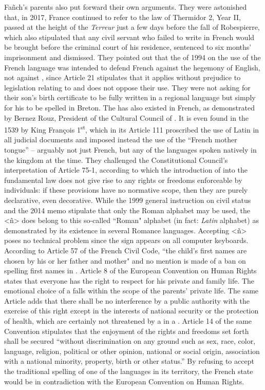 \documentclass[output=paper,colorlinks,citecolor=brown]{langscibook}
\begin{document}
Fañch's parents also put forward their own arguments. They were astonished that, in 2017, France continued to refer to the law of Thermidor 2, Year II, passed at the height of the \textit{Terreur} just a few days before the fall of Robespierre, which also stipulated that any civil servant who failed to write in French would be brought before the criminal court of his residence, sentenced to six months' imprisonment and dismissed. They pointed out that the  of 1994 on the use of the French language was intended to defend French against the hegemony of English, not against , since Article 21 stipulates that it applies without prejudice to legislation relating to  and does not oppose their use. They were not asking for their son's birth certificate to be fully written in a regional language but simply for his  to be spelled in Breton. The  has also existed in French, as demonstrated by Bernez Rouz, President of the Cultural Council of . It is even found in the 1539  by King François 1\textsuperscript{st}, which in its Article 111 proscribed the use of Latin in all judicial documents and imposed instead the use of the ``French mother tongue” – arguably not just French, but any of the languages spoken natively in the kingdom at the time. They challenged the Constitutional Council's interpretation of Article 75-1, according to which the introduction of  into the fundamental law does not give rise to any rights or freedoms enforceable by individuals: if these provisions have no normative scope, then they are purely declarative, even decorative. While the 1999 general instruction on civil status and the 2014 memo stipulate that only the Roman alphabet may be used, the <ñ> does belong to this so-called ``Roman" alphabet (in fact: \textit{Latin} alphabet) as demonstrated by its existence in several Romance languages. Accepting <ñ> poses no technical problem since the sign appears on all computer keyboards. According to Article 57 of the French Civil Code, ``the child's first names are chosen by his or her father and mother" and no mention is made of a ban on spelling first names in . Article 8 of the European Convention on Human Rights states that everyone has the right to respect for his private and family life. The emotional choice of a  falls within the scope of the parents' private life. The same Article adds that there shall be no interference by a public authority with the exercise of this right except in the interests of national security or the protection of health, which are certainly not threatened by a  in a . Article 14 of the same Convention stipulates that the enjoyment of the rights and freedoms set forth shall be secured ``without discrimination on any ground such as sex, race, color, language, religion, political or other opinion, national or social origin, association with a national minority, property, birth or other status.” By refusing to accept the traditional spelling of one of the languages in its territory, the French state would be in contradiction with the European Convention on Human Rights.
\end{document}
